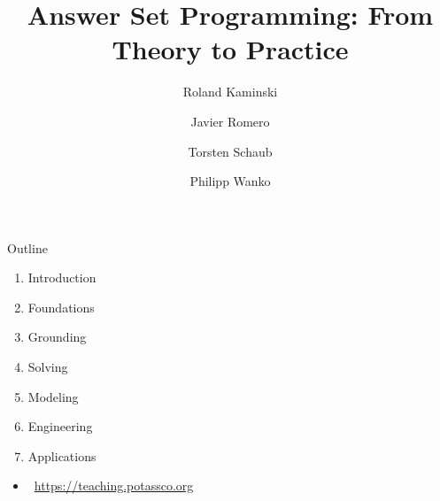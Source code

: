 \documentclass[t,fleqn]{beamer}
\title[Answer Set Programming]{Answer Set Programming: From Theory to Practice}
\author[Potassco]{Roland Kaminski \and Javier Romero \and Torsten Schaub \and Philipp Wanko}
\institute[KRR@UP]{University of Potsdam\\\bigskip\bigskip\texttt{[image: potassco\_logo\_lightblue]}}
\date{}
\begin{document}
\frame{\titlepage}
\begin{frame}{Outline}
  \bigskip
  \begin{enumerate}
  \item Introduction
  \item Foundations
  \item Grounding
  \item Solving
  \item Modeling
  \item Engineering
  \item Applications
  \end{enumerate}
  \bigskip
  \begin{itemize}
  \item[]  \ \url{https://teaching.potassco.org}
  \end{itemize}
\end{frame}








\nocite{gekakasc12a,PotasscoUserGuide,karoscwa20a}


\end{document}
